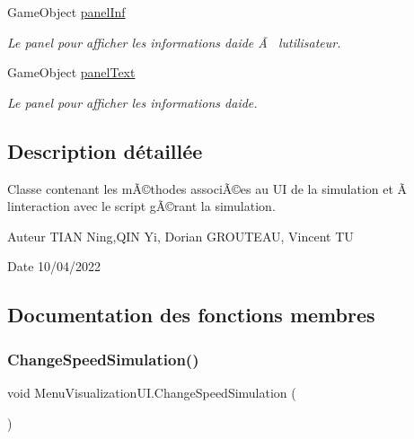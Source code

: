 \begin{DoxyCompactItemize}
Game\+Object \mbox{\hyperlink{class_menu_visualization_u_i_ac04938fb4312a4f1c2f920a3eb4f7724}{panel\+Inf}}
\begin{DoxyCompactList}\small\item\em Le panel pour afficher les informations d\textquotesingle{}aide Ã  l\textquotesingle{}utilisateur. \end{DoxyCompactList}\item 
Game\+Object \mbox{\hyperlink{class_menu_visualization_u_i_afb3f0b8c1a97e54dc40514db77041fcf}{panel\+Text}}
\begin{DoxyCompactList}\small\item\em Le panel pour afficher les informations d\textquotesingle{}aide. \end{DoxyCompactList}\end{DoxyCompactItemize}


\subsection{Description détaillée}
Classe contenant les mÃ©thodes associÃ©es au UI de la simulation et Ã  l\textquotesingle{}interaction avec le script gÃ©rant la simulation. 

\begin{DoxyAuthor}{Auteur}
T\+I\+AN Ning,Q\+IN Yi, Dorian G\+R\+O\+U\+T\+E\+AU, Vincent TU 
\end{DoxyAuthor}
\begin{DoxyDate}{Date}
10/04/2022 
\end{DoxyDate}


\subsection{Documentation des fonctions membres}
\mbox{\label{class_menu_visualization_u_i_abae4f4813543053bd5fc9d68ed4916d5}} 
\subsubsection{\texorpdfstring{Change\+Speed\+Simulation()}{ChangeSpeedSimulation()}}
{\footnotesize\ttfamily void Menu\+Visualization\+U\+I.\+Change\+Speed\+Simulation (\begin{DoxyParamCaption}{ }\end{DoxyParamCaption})\hspace{0.3cm}{\ttfamily [inline]}}



